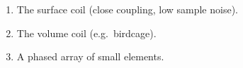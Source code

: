 \begin{enumerate}[leftmargin=1.6em,itemsep=2pt]
\item The surface coil (close coupling, low sample noise).
\item The volume coil (e.g.\ birdcage).
\item A phased array of small elements.
\end{enumerate}
